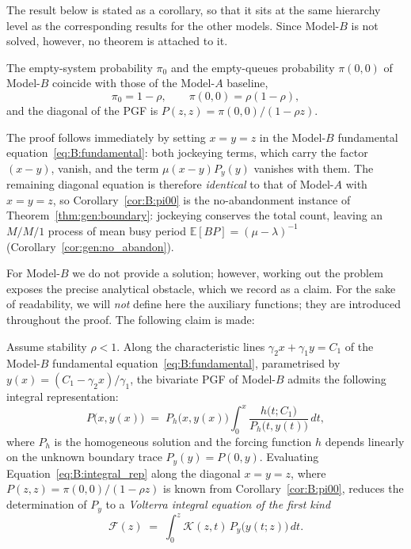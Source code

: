 The result below is stated as a corollary, so that it sits at the same hierarchy level as the corresponding results for the other models. Since Model-$B$ is not solved, however, no theorem is attached to it.
\begin{corollary}\label{cor:B:pi00}
    The empty-system probability $\pi_0$ and the empty-queues probability $\pi(0,0)$ of Model-$B$ coincide with those of the Model-$A$ baseline,
    \begin{equation}
        \pi_0 = 1-\rho, \qquad \pi(0,0) = \rho(1-\rho),
        \label{eq:B:pi00}
    \end{equation}
    and the diagonal of the PGF is $P(z,z)=\pi(0,0)/(1-\rho z)$.
\end{corollary}
The proof follows immediately by setting $x=y=z$ in the Model-$B$ fundamental equation~\eqref{eq:B:fundamental}: both jockeying terms, which carry the factor $(x-y)$, vanish, and the term $\mu(x-y)P_y(y)$ vanishes with them. The remaining diagonal equation is therefore \emph{identical} to that of Model-$A$ with $x=y=z$, so Corollary~\ref{cor:B:pi00} is the no-abandonment instance of Theorem~\ref{thm:gen:boundary}: jockeying conserves the total count, leaving an $M/M/1$ process of mean busy period $\mathbb{E}[BP]=(\mu-\lambda)^{-1}$ (Corollary~\ref{cor:gen:no_abandon}).


For Model-$B$ we do not provide a solution; however, working out the problem exposes the precise analytical obstacle, which we record as a claim. For the sake of readability, we will \emph{not} define here the auxiliary functions; they are introduced throughout the proof. The following claim is made:
\begin{claim}\label{clm:B:volterra}
 Assume stability $\rho<1$. Along the characteristic lines $\gamma_2 x+\gamma_1 y=C_1$ of the Model-$B$ fundamental equation~\eqref{eq:B:fundamental}, parametrised by $y(x)=(C_1-\gamma_2 x)/\gamma_1$, the bivariate PGF of Model-$B$ admits the following integral representation:
    \begin{equation}
        P\bigl(x,y(x)\bigr) \;=\; P_h\bigl(x,y(x)\bigr)\int_{0}^{x}
        \frac{h\bigl(t;C_1\bigr)}{P_h\bigl(t,y(t)\bigr)}\,dt,
        \label{eq:B:integral_rep}
    \end{equation}
    where $P_h$ is the homogeneous solution and the forcing function $h$ depends linearly on the unknown boundary trace $P_y(y)=P(0,y)$. Evaluating Equation~\eqref{eq:B:integral_rep} along the diagonal $x=y=z$, where $P(z,z)=\pi(0,0)/(1-\rho z)$ is known from Corollary~\ref{cor:B:pi00}, reduces the determination of $P_y$ to a \emph{Volterra integral equation of the first kind}
    \begin{equation}
        \mathcal{F}(z) \;=\; \int_0^z \mathcal{K}(z,t)\,P_y\!\bigl(y(t;z)\bigr)\,dt.
        \label{eq:B:volterra}
    \end{equation}
\end{claim}


